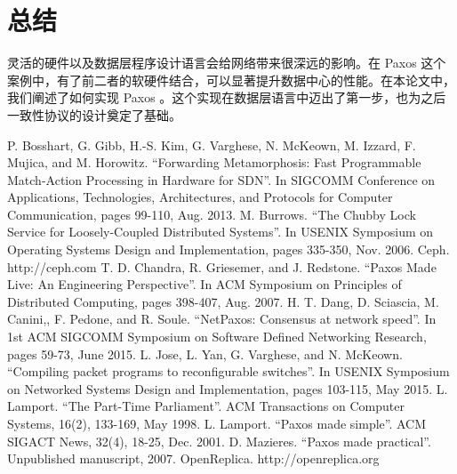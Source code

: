 \documentclass[conference]{IEEEtran}
\begin{document}
\section{总结}

灵活的硬件以及数据层程序设计语言会给网络带来很深远的影响。在 Paxos 这个案例中，有了前二者的软硬件结合，可以显著提升数据中心的性能。在本论文中，我们阐述了如何实现 Paxos 。这个实现在数据层语言中迈出了第一步，也为之后一致性协议的设计奠定了基础。

\begin{thebibliography}{00}
 P. Bosshart, G. Gibb, H.-S. Kim, G. Varghese, N. McKeown, M. Izzard, F. Mujica, and M. Horowitz. ``Forwarding Metamorphosis: Fast Programmable Match-Action Processing in Hardware for SDN''. In SIGCOMM Conference on Applications, Technologies, Architectures, and Protocols for Computer Communication, pages 99-110, Aug. 2013.
 M. Burrows. ``The Chubby Lock Service for Loosely-Coupled Distributed Systems''. In USENIX Symposium on Operating Systems Design and Implementation, pages 335-350, Nov. 2006. 
 Ceph. http://ceph.com
 T. D. Chandra, R. Griesemer, and J. Redstone. ``Paxos Made Live: An Engineering Perspective''. In ACM Symposium on Principles of Distributed Computing, pages 398-407, Aug. 2007. 
 H. T. Dang, D. Sciascia, M. Canini,, F. Pedone, and R. Soule. ``NetPaxos: Consensus at network speed''. In 1st ACM SIGCOMM Symposium on Software Defined Networking Research, pages 59-73, June 2015. 
 L. Jose, L. Yan, G. Varghese, and N. McKeown. ``Compiling packet programs to reconfigurable switches''. In USENIX Symposium on Networked Systems Design and Implementation, pages 103-115, May 2015. 
 L. Lamport. ``The Part-Time Parliament''. ACM Transactions on Computer Systems, 16(2), 133-169, May 1998.
 L. Lamport. ``Paxos made simple''. ACM SIGACT News, 32(4), 18-25, Dec. 2001. 
 D. Mazieres. ``Paxos made practical''. Unpublished manuscript, 2007. 
 OpenReplica. http://openreplica.org
\end{thebibliography}
\end{document}
